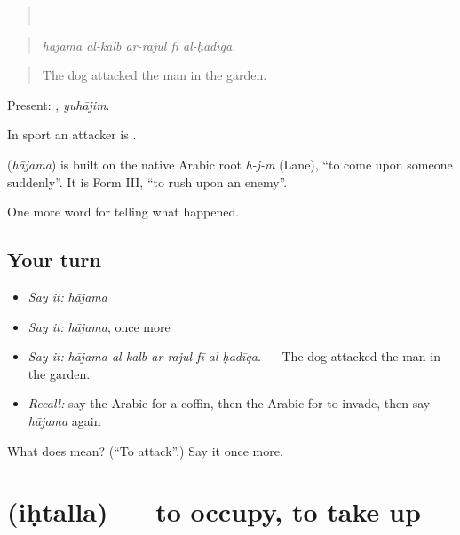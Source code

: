 \begin{quote}
    .
\end{quote}

\begin{quote}
\emph{hājama al-kalb ar-rajul fī al-ḥadīqa.}
\end{quote}

\begin{quote}
The dog attacked the man in the garden.
\end{quote}

Present: , \emph{yuhājim}.

In sport an attacker is .

\begin{cousinweb}
\textbf{} (\emph{hājama}) is built on the native Arabic root \emph{h-j-m} (Lane), \textquotedblleft{}to come upon someone suddenly\textquotedblright{}. It is Form III, \textquotedblleft{}to rush upon an enemy\textquotedblright{}.
\end{cousinweb}

\begin{grammarlens}[title={What you've built}]
One more word for telling what happened.
\end{grammarlens}

\subsection*{Your turn}
\begin{itemize}
\raggedright
  \item \emph{Say it:} \emph{hājama}
  \item \emph{Say it:} \emph{hājama}, once more
  \item \emph{Say it:} \emph{hājama al-kalb ar-rajul fī al-ḥadīqa.} — The dog attacked the man in the garden.
  \item \emph{Recall:} say the Arabic for a coffin, then the Arabic for to invade, then say \emph{hājama} again
\end{itemize}

\begin{tcolorbox}[breakable,colback=teal!4,colframe=teal!35!black,title={Before you move on}]
What does  mean? (\textquotedblleft{}To attack\textquotedblright{}.) Say it once more.
\end{tcolorbox}
\section[\texorpdfstring{\ar{احتل} (iḥtalla)}{احتل (iḥtalla)}]{ (iḥtalla) — to occupy, to take up}

